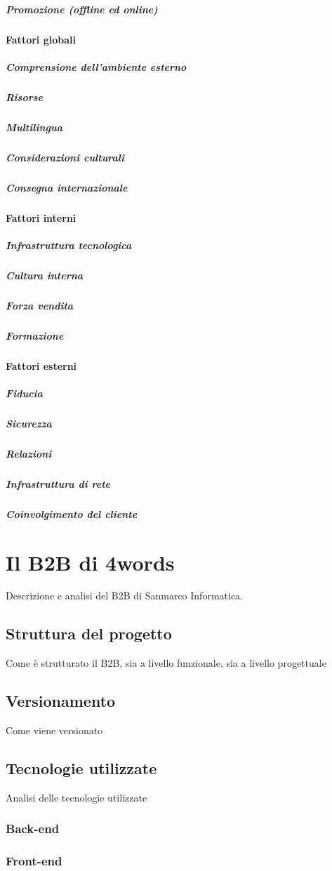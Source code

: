 \subparagraph{Promozione (offline ed online)}
\paragraph{Fattori globali}
\subparagraph{Comprensione dell'ambiente esterno}
\subparagraph{Risorse}
\subparagraph{Multilingua}
\subparagraph{Considerazioni culturali}
\subparagraph{Consegna internazionale}
\paragraph{Fattori interni}
\subparagraph{Infrastruttura tecnologica}
\subparagraph{Cultura interna}
\subparagraph{Forza vendita}
\subparagraph{Formazione}
\paragraph{Fattori esterni}
\subparagraph{Fiducia}
\subparagraph{Sicurezza}
\subparagraph{Relazioni}
\subparagraph{Infrastruttura di rete}
\subparagraph{Coinvolgimento del cliente}
\section{Il B2B di 4words}
Descrizione e analisi del B2B di Sanmarco Informatica.
\subsection{Struttura del progetto}
Come è strutturato il B2B, sia a livello funzionale, sia a livello progettuale
\subsection{Versionamento}
Come viene versionato
\subsection{Tecnologie utilizzate}
Analisi delle tecnologie utilizzate
\subsubsection{Back-end}
\subsubsection{Front-end}